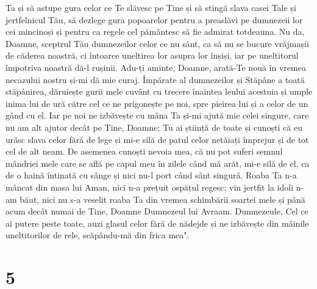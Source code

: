 Ta și să astupe gura celor ce Te slăvesc pe Tine și să stingă slava casei Tale și jertfelnicul Tău, să dezlege gura popoarelor pentru a preaslăvi pe dumnezeii lor cei mincinoși și pentru ca regele cel pământesc să fie admirat totdeauna. Nu da, Doamne, sceptrul Tău dumnezeilor celor ce nu sânt, ca să nu se bucure vrăjmașii de căderea noastră, ci întoarce uneltirea lor asupra lor înșiși, iar pe uneltitorul împotriva noastră dă-l rușinii. Adu-ți aminte, Doamne, arată-Te nouă în vremea necazului nostru și-mi dă mie curaj. Împărate al dumnezeilor și Stăpâne a toată stăpânirea, dăruiește gurii mele cuvânt cu trecere înaintea leului acestuia și umple inima lui de ură către cel ce ne prigonește pe noi, spre pieirea lui și a celor de un gând cu el. Iar pe noi ne izbăvește cu mâna Ta și-mi ajută mie celei singure, care nu am alt ajutor decât pe Tine, Doamne; Tu ai știință de toate și cunoști că eu urăsc slava celor fără de lege și mi-e silă de patul celor netăiați împrejur și de tot cel de alt neam. De asemenea cunoști nevoia mea, că nu pot suferi semnul mândriei mele care se află pe capul meu în zilele când mă arăt, mi-e silă de el, ca de o haină întinată cu sânge și nici nu-l port când sânt singură. Roaba Ta n-a mâncat din masa lui Aman, nici n-a prețuit ospățul regesc; vin jertfit la idoli n-am băut, nici nu s-a veselit roaba Ta din vremea schimbării soartei mele și până acum decât numai de Tine, Doamne Dumnezeul lui Avraam. Dumnezeule, Cel ce ai putere peste toate, auzi glasul celor fără de nădejde și ne izbăvește din mâinile uneltitorilor de rele, scăpându-mă din frica mea".

\chapter{5}

